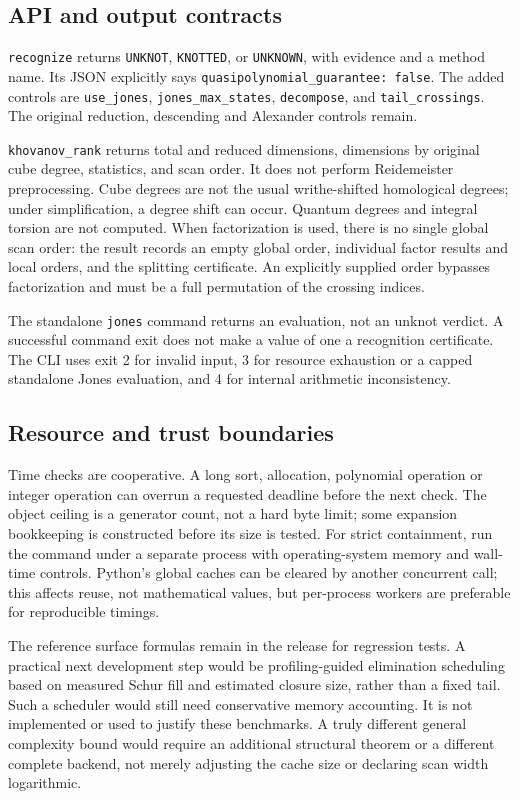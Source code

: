 \documentclass[11pt]{article}
\theoremstyle{remark}\newtheorem{remark}[theorem]{Remark}
\begin{document}
\subsection{API and output contracts}
\texttt{recognize} returns \texttt{UNKNOT}, \texttt{KNOTTED}, or
\texttt{UNKNOWN}, with evidence and a method name. Its JSON explicitly says
\texttt{quasipolynomial\_guarantee: false}. The added controls are
\texttt{use\_jones}, \texttt{jones\_max\_states}, \texttt{decompose},
and \texttt{tail\_crossings}. The original reduction, descending and
Alexander controls remain.

\texttt{khovanov\_rank} returns total and reduced dimensions, dimensions
by original cube degree, statistics, and scan order. It does not perform
Reidemeister preprocessing. Cube degrees are not the usual writhe-shifted
homological degrees; under simplification, a degree shift can occur.
Quantum degrees and integral torsion are not computed. When factorization
is used, there is no single global scan order: the result records an empty
global order, individual factor results and local orders, and the splitting
certificate. An explicitly supplied order bypasses factorization and must
be a full permutation of the crossing indices.

The standalone \texttt{jones} command returns an evaluation, not an unknot
verdict. A successful command exit does not make a value of one a
recognition certificate. The CLI uses exit 2 for invalid input, 3 for
resource exhaustion or a capped standalone Jones evaluation, and 4 for
internal arithmetic inconsistency.

\subsection{Resource and trust boundaries}
Time checks are cooperative. A long sort, allocation, polynomial operation
or integer operation can overrun a requested deadline before the next
check. The object ceiling is a generator count, not a hard byte limit;
some expansion bookkeeping is constructed before its size is tested.
For strict containment, run the command under a separate process with
operating-system memory and wall-time controls. Python's global caches can
be cleared by another concurrent call; this affects reuse, not mathematical
values, but per-process workers are preferable for reproducible timings.

The reference surface formulas remain in the release for regression tests.
A practical next development step would be profiling-guided elimination
scheduling based on measured Schur fill and estimated closure size, rather
than a fixed tail. Such a scheduler would still need conservative memory
accounting. It is not implemented or used to justify these benchmarks.
A truly different general complexity bound would require an additional
structural theorem or a different complete backend, not merely adjusting
the cache size or declaring scan width logarithmic.
\end{document}
